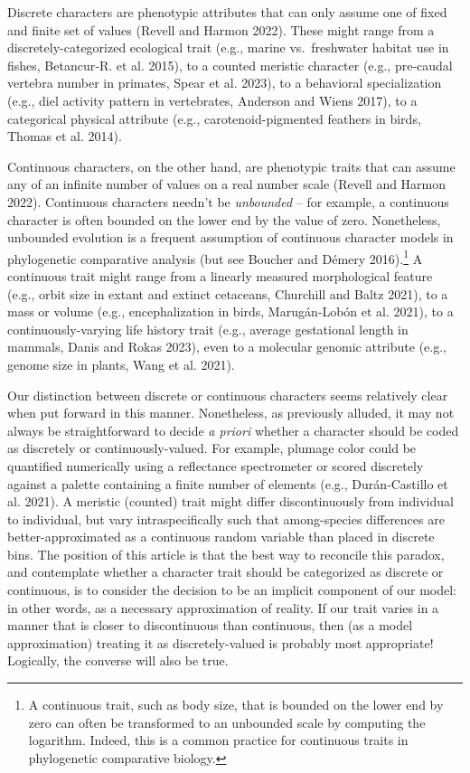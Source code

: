 \documentclass{article}
\begin{document}
Discrete characters are phenotypic attributes that can only assume one of fixed and finite set of values (Revell and Harmon 2022). These might range from a discretely-categorized ecological trait (e.g., marine vs.~freshwater habitat use in fishes, Betancur‐R. et al. 2015), to a counted meristic character (e.g., pre-caudal vertebra number in primates, Spear et al. 2023), to a behavioral specialization (e.g., diel activity pattern in vertebrates, Anderson and Wiens 2017), to a categorical physical attribute (e.g., carotenoid-pigmented feathers in birds, Thomas et al. 2014).

Continuous characters, on the other hand, are phenotypic traits that can assume any of an infinite number of values on a real number scale (Revell and Harmon 2022). Continuous characters needn't be \emph{unbounded} -- for example, a continuous character is often bounded on the lower end by the value of zero. Nonetheless, unbounded evolution is a frequent assumption of continuous character models in phylogenetic comparative analysis (but see Boucher and Démery 2016).\footnote{A continuous trait, such as body size, that is bounded on the lower end by zero can often be transformed to an unbounded scale by computing the logarithm. Indeed, this is a common practice for continuous traits in phylogenetic comparative biology.} A continuous trait might range from a linearly measured morphological feature (e.g., orbit size in extant and extinct cetaceans, Churchill and Baltz 2021), to a mass or volume (e.g., encephalization in birds, Marugán‐Lobón et al. 2021), to a continuously-varying life history trait (e.g., average gestational length in mammals, Danis and Rokas 2023), even to a molecular genomic attribute (e.g., genome size in plants, Wang et al. 2021).

Our distinction between discrete or continuous characters seems relatively clear when put forward in this manner. Nonetheless, as previously alluded, it may not always be straightforward to decide \emph{a priori} whether a character should be coded as discretely or continuously-valued. For example, plumage color could be quantified numerically using a reflectance spectrometer or scored discretely against a palette containing a finite number of elements (e.g., Durán‐Castillo et al. 2021). A meristic (counted) trait might differ discontinuously from individual to individual, but vary intraspecifically such that among-species differences are better-approximated as a continuous random variable than placed in discrete bins. The position of this article is that the best way to reconcile this paradox, and contemplate whether a character trait should be categorized as discrete or continuous, is to consider the decision to be an implicit component of our model: in other words, as a necessary approximation of reality. If our trait varies in a manner that is closer to discontinuous than continuous, then (as a model approximation) treating it as discretely-valued is probably most appropriate! Logically, the converse will also be true.
\end{document}

